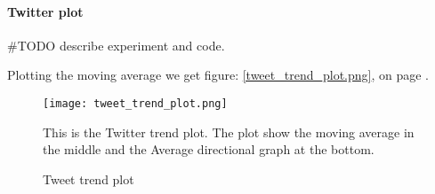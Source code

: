 \paragraph{Twitter plot}
#TODO describe experiment and code. 

Plotting the moving average we get figure: \ref{tweet_trend_plot.png}, on page
\pageref{tweet_trend_plot.png}.

\begin{figure}[htb]
    \texttt{[image: tweet\_trend\_plot.png]}
    \label{fig:trend_tweet_plot}
    \caption{Tweet trend plot}
This is the Twitter trend plot. The plot show the moving average in the middle
and the Average directional graph at the bottom.
\end{figure}
%

